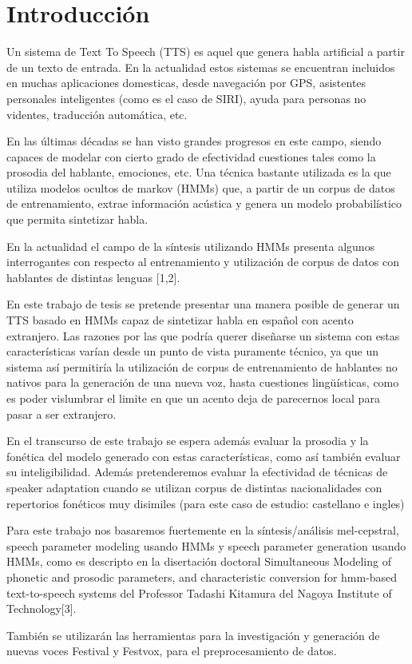 \section{Introducción}

Un sistema de Text To Speech (TTS) es aquel que genera habla artificial a partir de un texto de entrada. En la actualidad estos sistemas se encuentran incluidos en muchas aplicaciones domesticas, desde navegación por GPS, asistentes personales inteligentes (como es el caso de SIRI), ayuda para personas no videntes, traducción automática, etc.

En las últimas décadas se han visto grandes progresos en este campo, siendo capaces de modelar con cierto grado de efectividad cuestiones tales como la prosodia del hablante, emociones, etc. Una técnica bastante utilizada es la que utiliza modelos ocultos de markov (HMMs) que, a partir de un corpus de datos de entrenamiento, extrae información acústica y genera un modelo probabilístico que permita sintetizar habla. 


En la actualidad el campo de la síntesis utilizando HMMs presenta algunos interrogantes con respecto al entrenamiento y utilización de corpus de datos con hablantes de distintas lenguas [1,2]. 

En este trabajo de tesis se pretende presentar una manera posible de generar un TTS basado en HMMs capaz de sintetizar habla en español con acento extranjero. Las razones por las que podría querer diseñarse un sistema con estas características varían desde un punto de vista puramente técnico, ya que un sistema así permitiría la utilización de corpus de entrenamiento de hablantes no nativos para la generación de una nueva voz, hasta cuestiones lingüísticas, como es poder vislumbrar el limite en que un acento deja de parecernos local para pasar a ser extranjero.

En el transcurso de este trabajo se espera además evaluar la prosodia y la fonética del modelo generado con estas características, como así también evaluar su inteligibilidad. Además pretenderemos evaluar la efectividad de técnicas de speaker adaptation cuando se utilizan corpus de distintas nacionalidades con repertorios fonéticos muy disimiles (para este caso de estudio: castellano e ingles)

Para este trabajo nos basaremos fuertemente en la síntesis/análisis mel-cepstral, speech parameter modeling usando HMMs y speech parameter generation usando HMMs, como es descripto en la disertación doctoral Simultaneous Modeling of phonetic and prosodic parameters, and characteristic conversion for hmm-based text-to-speech systems del Professor Tadashi Kitamura del Nagoya Institute of Technology[3].

También se utilizarán las herramientas para la investigación y generación de nuevas voces Festival y Festvox, para el preprocesamiento de datos.